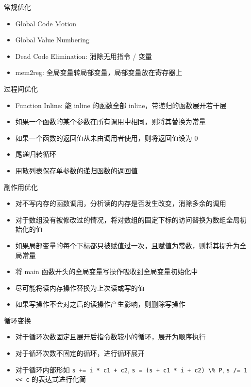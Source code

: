 \documentclass[aspectratio=169,UTF-8]{ctexbeamer}
\begin{document}
		\begin{frame}{常规优化}
			\begin{itemize}
				\item Global Code Motion
				\item Global Value Numbering
				\item Dead Code Elimination: 消除无用指令 / 变量
				\item mem2reg: 全局变量转局部变量，局部变量放在寄存器上
			\end{itemize}
		\end{frame}
		
		\begin{frame}{过程间优化}
			\begin{itemize}
				\item Function Inline: 能 inline 的函数全部 inline，带递归的函数展开若干层
				\item 如果一个函数的某个参数在所有调用中相同，则将其替换为常量	
				\item 如果一个函数的返回值从未由调用者使用，则将返回值设为 0
				\item 尾递归转循环
				\item 用散列表保存单参数的递归函数的返回值
			\end{itemize}
		\end{frame}
		
		\begin{frame}{副作用优化}
			\begin{itemize}
				\item 对不写内存的函数调用，分析读的内存是否发生改变，消除多余的调用
				\item 对于数组没有被修改过的情况，将对数组的固定下标的访问替换为数组全局初始化的值
				\item 如果局部变量的每个下标都只被赋值过一次，且赋值为常数，则将其提升为全局常量
				\item 将 main 函数开头的全局变量写操作吸收到全局变量初始化中
				\item 尽可能将读内存操作替换为上次读或写的值
				\item 如果写操作不会对之后的读操作产生影响，则删除写操作
			\end{itemize}
		\end{frame}
		
		\begin{frame}{循环变换}
			\begin{itemize}
				\item 对于循环次数固定且展开后指令数较小的循环，展开为顺序执行
				\item 对于循环次数不固定的循环，进行循环展开
				\item 对于循环内部形如 \lstinline{s += i * c1 + c2}, \lstinline{s = (s + c1 * i + c2) \% P}, \lstinline{s /= 1 << c} 的表达式进行化简
			\end{itemize}
		\end{frame}
		
\end{document}
